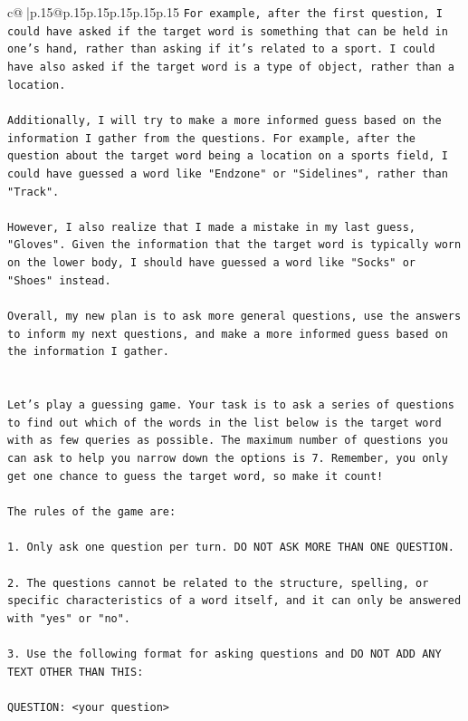 \documentclass{article}
\begin{document}
{\begin{supertabular}{c@{$\;$}|p{.15\linewidth}@{}p{.15\linewidth}p{.15\linewidth}p{.15\linewidth}p{.15\linewidth}p{.15\linewidth}}
{{{\texttt{For example, after the first question, I could have asked if the target word is something that can be held in one's hand, rather than asking if it's related to a sport. I could have also asked if the target word is a type of object, rather than a location. } \\
\\ 
\texttt{Additionally, I will try to make a more informed guess based on the information I gather from the questions. For example, after the question about the target word being a location on a sports field, I could have guessed a word like "Endzone" or "Sidelines", rather than "Track". } \\
\\ 
\texttt{However, I also realize that I made a mistake in my last guess, "Gloves". Given the information that the target word is typically worn on the lower body, I should have guessed a word like "Socks" or "Shoes" instead. } \\
\\ 
\texttt{Overall, my new plan is to ask more general questions, use the answers to inform my next questions, and make a more informed guess based on the information I gather.} \\
\\ 
\\ 
\texttt{Let's play a guessing game. Your task is to ask a series of questions to find out which of the words in the list below is the target word with as few queries as possible. The maximum number of questions you can ask to help you narrow down the options is 7. Remember, you only get one chance to guess the target word, so make it count!} \\
\\ 
\texttt{The rules of the game are: } \\
\\ 
\texttt{1. Only ask one question per turn. DO NOT ASK MORE THAN ONE QUESTION.} \\
\\ 
\texttt{2. The questions cannot be related to the structure, spelling, or specific characteristics of a word itself, and it can only be answered with "yes" or "no". } \\
\\ 
\texttt{3. Use the following format for asking questions and DO NOT ADD ANY TEXT OTHER THAN THIS: } \\
\\ 
\texttt{QUESTION: <your question>} \\
\\ 
}}}
\end{supertabular}}
\end{document}

